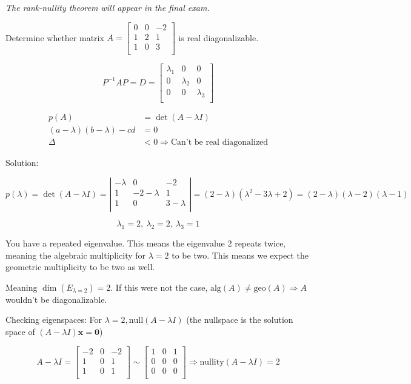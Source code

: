 \documentclass[12pt]{article}
\theoremstyle{plain}
\theoremstyle{remark}
\theoremstyle{definition}
\begin{document}
\emph{The rank-nullity theorem will appear in the final exam.}

Determine whether matrix \(A = \begin{bmatrix}
0 & 0 & - 2 \\
1 & 2 & 1 \\
1 & 0 & 3 \\
\end{bmatrix}\) is real diagonalizable.

\[P^{- 1}AP = D = \begin{bmatrix}
\lambda_{1} & 0 & 0 \\
0 & \lambda_{2} & 0 \\
0 & 0 & \lambda_{3} \\
\end{bmatrix}\]

\begin{align*}
p(A) &= \det(A - \lambda I) \\
(a - \lambda)(b - \lambda) - cd &= 0 \\
\Delta &< 0 \Rightarrow \text{Can't\ be\ real\ diagonalized}
\end{align*}


Solution:

\[p(\lambda) = \det(A - \lambda I) = \left| \begin{matrix}
 - \lambda & 0 & - 2 \\
1 & - 2 - \lambda & 1 \\
1 & 0 & 3 - \lambda \\
\end{matrix} \right| = (2 - \lambda)\left( \lambda^{2} - 3\lambda + 2 \right) = (2 - \lambda)(\lambda - 2)(\lambda - 1)\]

\[\lambda_{1} = 2,\ \lambda_{2} = 2,\ \lambda_{3} = 1\]

You have a repeated eigenvalue. This means the eigenvalue 2 repeats
twice, meaning the algebraic multiplicity for \(\lambda = 2\) to be two.
This means we expect the geometric multiplicity to be two as well.

Meaning \(\dim\left( E_{\lambda = 2} \right) = 2\). If this were not the
case, \(\text{alg}(A) \neq \text{geo}(A) \Rightarrow A\) wouldn't be
diagonalizable.

Checking eigenspaces: For \(\lambda = 2,\text{null}(A - \lambda I)\)
(the nullspace is the solution space of
\((A - \lambda I)\mathbf{x} = \mathbf{0}\))

\[A - \lambda I = \begin{bmatrix}
 - 2 & 0 & - 2 \\
1 & 0 & 1 \\
1 & 0 & 1 \\
\end{bmatrix}\sim\begin{bmatrix}
1 & 0 & 1 \\
0 & 0 & 0 \\
0 & 0 & 0 \\
\end{bmatrix} \Rightarrow \text{nullity}(A - \lambda I) = 2\]
\end{document}

